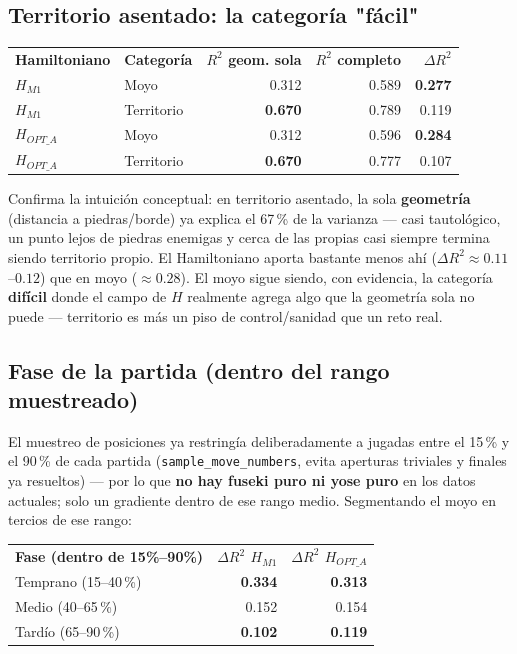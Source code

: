 \documentclass[11pt, a4paper]{article}
\newcommand{\TH}[1]{\cellcolor{cTHbg}\color{white}\textbf{#1}}
\newcommand{\good}[1]{\color{cGood}\textbf{#1}}
\newcommand{\bad}[1]{\color{cBad}\textbf{#1}}
\begin{document}
\subsection{Territorio asentado: la categor\'ia "f\'acil"}

\medskip
\begin{center}
\begin{tabular}{llrrr}
  \TH{Hamiltoniano} & \TH{Categor\'ia} & \TH{$R^2$ geom. sola} & \TH{$R^2$ completo} & \TH{$\Delta R^2$} \\[1pt]
  $H_{M1}$      & Moyo       & 0.312 & 0.589 & \good{0.277} \\
  $H_{M1}$      & Territorio & \good{0.670} & 0.789 & 0.119 \\
  $H_{OPT\_A}$  & Moyo       & 0.312 & 0.596 & \good{0.284} \\
  $H_{OPT\_A}$  & Territorio & \good{0.670} & 0.777 & 0.107 \\
\end{tabular}
\end{center}
\medskip

\begin{tcolorbox}[quotebox]
  Confirma la intuici\'on conceptual: en territorio asentado, la sola
  \textbf{geometr\'ia} (distancia a piedras/borde) ya explica el
  67\,\% de la varianza --- casi tautol\'ogico, un punto lejos de
  piedras enemigas y cerca de las propias casi siempre termina siendo
  territorio propio. El Hamiltoniano aporta bastante menos ah\'i
  ($\Delta R^2\approx0.11$--$0.12$) que en moyo ($\approx0.28$). El
  moyo sigue siendo, con evidencia, la categor\'ia \textbf{dif\'icil}
  donde el campo de $H$ realmente agrega algo que la geometr\'ia sola
  no puede --- territorio es m\'as un piso de control/sanidad que un
  reto real.
\end{tcolorbox}

\subsection{Fase de la partida (dentro del rango muestreado)}

El muestreo de posiciones ya restring\'ia deliberadamente a
jugadas entre el 15\,\% y el 90\,\% de cada partida
(\texttt{sample\_move\_numbers}, evita aperturas triviales y finales ya
resueltos) --- por lo que \textbf{no hay fuseki puro ni yose puro} en
los datos actuales; solo un gradiente dentro de ese rango medio.
Segmentando el moyo en tercios de ese rango:

\medskip
\begin{center}
\begin{tabular}{lrr}
  \TH{Fase (dentro de 15\%--90\%)} & \TH{$\Delta R^2$ $H_{M1}$} & \TH{$\Delta R^2$ $H_{OPT\_A}$} \\[1pt]
  Temprano (15--40\,\%) & \good{0.334} & \good{0.313} \\
  Medio (40--65\,\%)    & 0.152 & 0.154 \\
  Tard\'io (65--90\,\%) & \bad{0.102} & \bad{0.119} \\
\end{tabular}
\end{center}
\medskip
\end{document}
